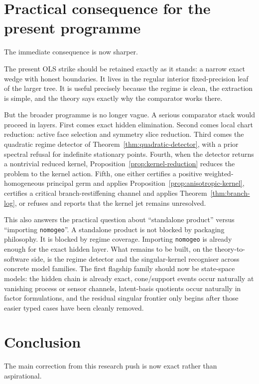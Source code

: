 \documentclass[11pt,a4paper]{article}
\numberwithin{equation}{section}
\theoremstyle{thmcompact}
\theoremstyle{remark}
\begin{document}
\section{Practical consequence for the present programme}

The immediate consequence is now sharper.

The present OLS strike should be retained exactly as it stands: a narrow exact wedge with honest boundaries. It lives in the regular interior fixed-precision leaf of the larger tree. It is useful precisely because the regime is clean, the extraction is simple, and the theory says exactly why the comparator works there.

But the broader programme is no longer vague. A serious comparator stack would proceed in layers. First comes exact hidden elimination. Second comes local chart reduction: active face selection and symmetry slice reduction. Third comes the quadratic regime detector of Theorem~\ref{thm:quadratic-detector}, with a prior spectral refusal for indefinite stationary points. Fourth, when the detector returns a nontrivial reduced kernel, Proposition~\ref{prop:kernel-reduction} reduces the problem to the kernel action. Fifth, one either certifies a positive weighted-homogeneous principal germ and applies Proposition~\ref{prop:anisotropic-kernel}, certifies a critical branch-restiffening channel and applies Theorem~\ref{thm:branch-log}, or refuses and reports that the kernel jet remains unresolved.

This also answers the practical question about ``standalone product'' versus ``importing \texttt{nomogeo}''. A standalone product is not blocked by packaging philosophy. It is blocked by regime coverage. Importing \texttt{nomogeo} is already enough for the exact hidden layer. What remains to be built, on the theory-to-software side, is the regime detector and the singular-kernel recogniser across concrete model families. The first flagship family should now be state-space models: the hidden chain is already exact, cone/support events occur naturally at vanishing process or sensor channels, latent-basis quotients occur naturally in factor formulations, and the residual singular frontier only begins after those easier typed cases have been cleanly removed.

\section{Conclusion}

The main correction from this research push is now exact rather than aspirational.
\end{document}
